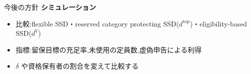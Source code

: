 \documentclass[aspectratio=43,11pt]{beamer}
\newcommand{\topf}{\mathrm{top}}
\newcommand{\dtop}[1]{d^{\topf}_{#1}}
\newcommand{\dV}[1]{d^{V}_{#1}}
\begin{document}

\begin{frame}{今後の方針}
\small
\textbf{シミュレーション}
\begin{itemize}
  \item 比較:flexible SSD・reserved category protecting SSD($\dtop{}$)・eligibility-based SSD($d^{V}$)
  \item 指標:留保目標の充足率,未使用の定員数,虚偽申告による利得
  \item $\delta$ や資格保有者の割合を変えて比較する
\end{itemize}
\end{frame}

\end{document}
